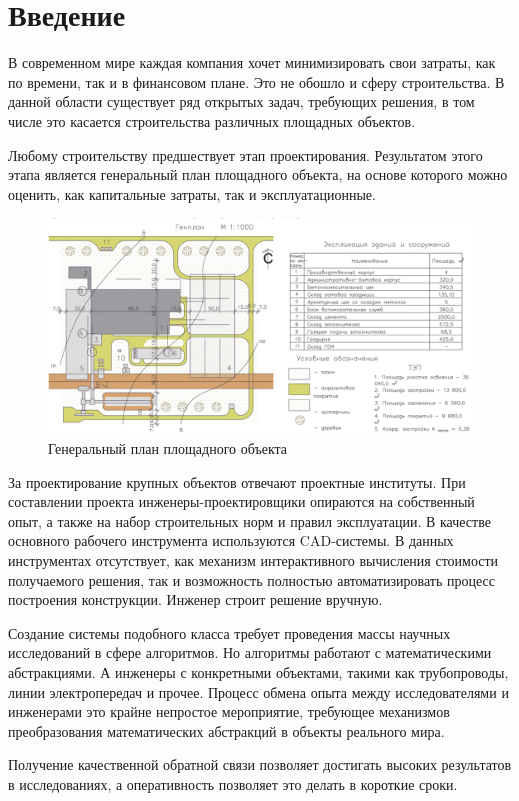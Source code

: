 \section*{\Large{Введение}}

В современном мире каждая компания хочет минимизировать свои затраты, как по времени, так и в финансовом плане.
Это не обошло и сферу строительства.
В данной области существует ряд открытых задач, требующих решения,
в том числе это касается строительства различных площадных объектов.

Любому строительству предшествует этап проектирования.
Результатом этого этапа является генеральный план площадного объекта,
на основе которого можно оценить, как капитальные затраты, так и эксплуатационные.

\begin{figure}
    \begin{center}
        \includegraphics[width=\textwidth]{introduction/pictures/site_plan}
    \end{center}
    \caption{Генеральный план площадного объекта}
    \label{pic:problem__site-plan}
\end{figure}

За проектирование крупных объектов отвечают проектные институты.
При составлении проекта инженеры-проектировщики опираются на собственный опыт, а также на набор строительных норм
и правил эксплуатации.
В качестве основного рабочего инструмента используются CAD-системы.
В данных инструментах отсутствует, как механизм интерактивного вычисления стоимости получаемого решения,
так и возможность полностью автоматизировать процесс построения конструкции. Инженер строит решение вручную.


Создание системы подобного класса требует проведения массы научных исследований в сфере алгоритмов.
Но алгоритмы работают с математическими абстракциями.
А инженеры с конкретными объектами, такими как трубопроводы, линии электропередач и прочее.
Процесс обмена опыта между исследователями и инженерами это крайне непростое мероприятие,
требующее механизмов преобразования математических абстракций в объекты реального мира.

Получение качественной обратной связи позволяет достигать высоких результатов в исследованиях, а оперативность
позволяет это делать в короткие сроки.
